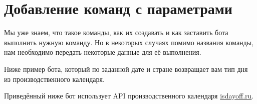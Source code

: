 \documentclass[
]{book}
\newenvironment{Shaded}{\begin{snugshade}}{\end{snugshade}}
\newcommand{\FunctionTok}[1]{\textcolor[rgb]{0.13,0.29,0.53}{\textbf{#1}}}
\newcommand{\NormalTok}[1]{#1}
\newcommand{\OtherTok}[1]{\textcolor[rgb]{0.56,0.35,0.01}{#1}}
\newcommand{\SpecialCharTok}[1]{\textcolor[rgb]{0.81,0.36,0.00}{\textbf{#1}}}
\begin{document}
\begin{Shaded}
\end{Shaded}

\section{Добавление команд с параметрами}\label{ux434ux43eux431ux430ux432ux43bux435ux43dux438ux435-ux43aux43eux43cux430ux43dux434-ux441-ux43fux430ux440ux430ux43cux435ux442ux440ux430ux43cux438}

Мы уже знаем, что такое команды, как их создавать и как заставить бота выполнить нужную команду. Но в некоторых случаях помимо названия команды, нам необходимо передать некоторые данные для её выполнения.

Ниже пример бота, который по заданной дате и стране возвращает вам тип дня из производственного календаря.

Приведённый ниже бот использует API производственного календаря \href{https://isdayoff.ru/}{isdayoff.ru}.
\end{document}
